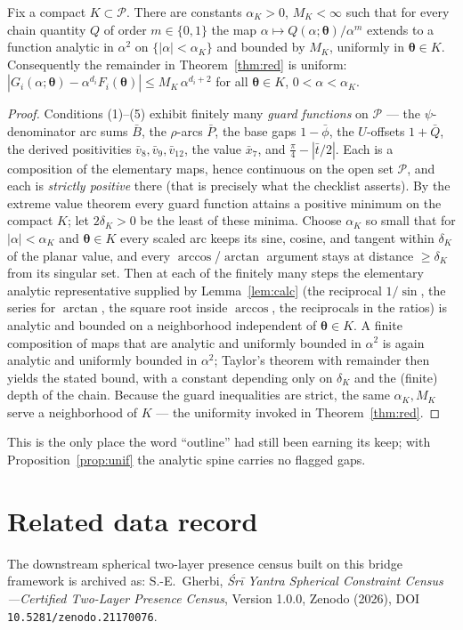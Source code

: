\documentclass[11pt]{article}
\theoremstyle{definition}\newtheorem{definition}{Definition}\newtheorem{remark}{Remark}
\begin{document}
\begin{proposition}\label{prop:unif}
Fix a compact $K\subset\mathcal P$. There are constants $\alpha_K>0$, $M_K<\infty$ such
that for every chain quantity $Q$ of order $m\in\{0,1\}$ the map
$\alpha\mapsto Q(\alpha;\boldsymbol\theta)/\alpha^{m}$ extends to a function analytic in
$\alpha^2$ on $\{|\alpha|<\alpha_K\}$ and bounded by $M_K$, uniformly in
$\boldsymbol\theta\in K$. Consequently the remainder in Theorem~\ref{thm:red} is uniform:
$|G_i(\alpha;\boldsymbol\theta)-\alpha^{d_i}F_i(\boldsymbol\theta)|\le M_K\,\alpha^{d_i+2}$
for all $\boldsymbol\theta\in K$, $0<\alpha<\alpha_K$.
\end{proposition}
\begin{proof}
Conditions \textup{(1)--(5)} exhibit finitely many \emph{guard functions} on
$\mathcal P$ --- the $\psi$-denominator arc sums $\bar B$, the $\rho$-arcs $\bar P$, the
base gaps $1-\bar\phi$, the $U$-offsets $1+\bar Q$, the derived positivities
$\bar v_8,\bar v_9,\bar v_{12}$, the value $\bar x_7$, and $\tfrac\pi4-|\bar t/2|$. Each
is a composition of the elementary maps, hence continuous on the open set $\mathcal P$,
and each is \emph{strictly positive} there (that is precisely what the checklist
asserts). By the extreme value theorem every guard function attains a positive minimum
on the compact $K$; let $2\delta_K>0$ be the least of these minima. Choose $\alpha_K$ so
small that for $|\alpha|<\alpha_K$ and $\boldsymbol\theta\in K$ every scaled arc keeps
its sine, cosine, and tangent within $\delta_K$ of the planar value, and every
$\arccos$/$\arctan$ argument stays at distance $\ge\delta_K$ from its singular set. Then
at each of the finitely many steps the elementary analytic representative supplied by
Lemma~\ref{lem:calc} (the reciprocal $1/\sin$, the series for $\arctan$, the square root
inside $\arccos$, the reciprocals in the ratios) is analytic and bounded on a
neighborhood independent of $\boldsymbol\theta\in K$. A finite composition of maps that
are analytic and uniformly bounded in $\alpha^2$ is again analytic and uniformly bounded
in $\alpha^2$; Taylor's theorem with remainder then yields the stated bound, with a
constant depending only on $\delta_K$ and the (finite) depth of the chain. Because the
guard inequalities are strict, the same $\alpha_K,M_K$ serve a neighborhood of $K$ ---
the uniformity invoked in Theorem~\ref{thm:red}.
\end{proof}

\noindent This is the only place the word ``outline'' had still been earning its keep;
with Proposition~\ref{prop:unif} the analytic spine carries no flagged gaps.

\section*{Related data record}

The downstream spherical two-layer presence census built on this bridge framework is archived as:
S.-E.~Gherbi, \emph{Śrī Yantra Spherical Constraint Census---Certified Two-Layer Presence Census},
Version 1.0.0, Zenodo (2026), DOI \texttt{10.5281/zenodo.21170076}.
\end{document}
